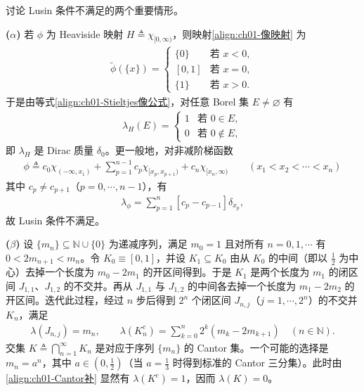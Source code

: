 \documentclass[../../main.tex]{subfiles}%
\begin{document}
讨论 Lusin 条件不满足的两个重要情形。

\textbf{($\alpha$)} 若 $\phi$ 为 Heaviside 映射 $H\triangleq\chi_{[0,\infty)}$，则映射\eqref{align:ch01-像映射} 为
\begin{align*}
\widetilde{\phi}(\{x\})=
\begin{cases}
\{0\} & \text{若 }x<0,\\
[0,1] & \text{若 }x=0,\\
\{1\} & \text{若 }x>0.
\end{cases}
\end{align*}
于是由等式\eqref{align:ch01-Stieltjes像公式}，对任意 Borel 集 $E\neq\varnothing$ 有
\begin{align*}
\lambda_H(E)=
\begin{cases}
1 & \text{若 }0\in E,\\
0 & \text{若 }0\notin E,
\end{cases}
\end{align*}
即 $\lambda_H$ 是 Dirac 质量 $\delta_0$。更一般地，对非减阶梯函数
\begin{align*}
\phi\triangleq c_0\chi_{(-\infty,x_1)}+\sum_{p=1}^{n-1}c_p\chi_{[x_p,x_{p+1})}+c_n\chi_{[x_n,\infty)}\qquad(x_1<x_2<\cdots<x_n)
\end{align*}
其中 $c_p\neq c_{p+1}$（$p=0,\cdots ,n-1$），有
\begin{align*}
\lambda_\phi=\sum_{p=1}^n[c_p-c_{p-1}]\delta_{x_p},
\end{align*}
故 Lusin 条件不满足。

\textbf{($\beta$)} 设 $\{m_n\}\subseteq\mathbb{N}\cup\{0\}$ 为递减序列，满足 $m_0=1$ 且对所有 $n=0,1,\cdots$ 有 $0<2m_{n+1}<m_n$。令 $K_0\equiv[0,1]$，并设 $K_1\subseteq K_0$ 由从 $K_0$ 的中间（即以 $\frac{1}{2}$ 为中心）去掉一个长度为 $m_0-2m_1$ 的开区间得到。于是 $K_1$ 是两个长度为 $m_1$ 的闭区间 $J_{1,1}$、$J_{1,2}$ 的不交并。再从 $J_{1,1}$ 与 $J_{1,2}$ 的中间各去掉一个长度为 $m_1-2m_2$ 的开区间。迭代此过程，经过 $n$ 步后得到 $2^n$ 个闭区间 $J_{n,j}$（$j=1,\cdots ,2^n$）的不交并 $K_n$，满足
\begin{align}
\lambda(J_{n,j})=m_n,\qquad
\lambda(K_n^c)=\sum_{k=0}^n2^k(m_k-2m_{k+1})\quad(n\in\mathbb{N}). \label{align:ch01-Cantor补}
\end{align}
交集 $K\triangleq\bigcap_{n=1}^\infty K_n$ 是对应于序列 $\{m_n\}$ 的 Cantor 集。一个可能的选择是 $m_n=a^n$，其中 $a\in(0,\frac{1}{2})$（当 $a=\frac{1}{3}$ 时得到标准的 Cantor 三分集）。此时由\eqref{align:ch01-Cantor补} 显然有 $\lambda(K^c)=1$，因而 $\lambda(K)=0$。
\end{document}
